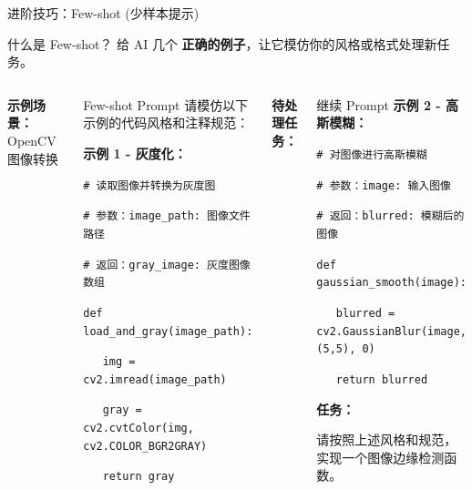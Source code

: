 \begin{frame}{进阶技巧：Few-shot (少样本提示)}
	\small
	\begin{block}{什么是 Few-shot？}
		给 AI 几个 \textbf{正确的例子}，让它模仿你的风格或格式处理新任务。
	\end{block}

	\vspace{0.3cm}

	\begin{columns}
		\textbf{示例场景：} OpenCV 图像转换

		\vspace{0.2cm}

		\begin{exampleblock}{Few-shot Prompt}
			请模仿以下示例的代码风格和注释规范：

			\vspace{0.2cm}

			\textbf{示例 1 - 灰度化：}

			\texttt{\# 读取图像并转换为灰度图}

			\texttt{\# 参数：image\_path: 图像文件路径}

			\texttt{\# 返回：gray\_image: 灰度图像数组}

			\texttt{def load\_and\_gray(image\_path):}

			\texttt{~~~img = cv2.imread(image\_path)}

			\texttt{~~~gray = cv2.cvtColor(img, cv2.COLOR\_BGR2GRAY)}

			\texttt{~~~return gray}
		\end{exampleblock}

		\textbf{待处理任务：}

		\vspace{0.2cm}

		\begin{exampleblock}{继续 Prompt}
			\textbf{示例 2 - 高斯模糊：}

			\texttt{\# 对图像进行高斯模糊}

			\texttt{\# 参数：image: 输入图像}

			\texttt{\# 返回：blurred: 模糊后的图像}

			\texttt{def gaussian\_smooth(image):}

			\texttt{~~~blurred = cv2.GaussianBlur(image, (5,5), 0)}

			\texttt{~~~return blurred}

			\vspace{0.3cm}

			\textbf{任务：}

			请按照上述风格和规范，实现一个图像边缘检测函数。
		\end{exampleblock}
	\end{columns}
\end{frame}

